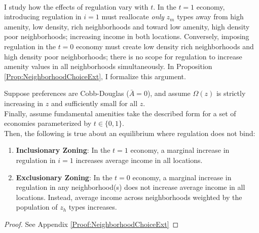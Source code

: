 \documentclass[12pt]{article}
\begin{document}
\paragraph*{} 
I study how the effects of regulation vary with $t$. In the $t = 1$ economy, introducing regulation in $i = 1$ must reallocate \textit{only} $z_{m}$ types away from high amenity, low density, rich neighborhoods and toward low amenity, high density poor neighborhoods; increasing income in both locations. Conversely, imposing regulation in the $t = 0$ economy must create low density rich neighborhoods and high density poor neighborhoods; there is no scope for regulation to increase amenity values in all neighborhoods simultaneously. In Proposition \ref{Prop:NeighborhoodChoiceExt}, I formalize this argument.

\begin{Proposition}\label{Prop:NeighborhoodChoiceExt}
	Suppose preferences are Cobb-Douglas ($\bar{A} = 0$), and assume $\Omega(z)$ is strictly increasing in $z$ and sufficiently small for all $z$. \\
	Finally, assume fundamental amenities take the described form for a set of economies parameterized by $t \in \{0, 1\}$. \\
	Then, the following is true about an equilibrium where regulation does not bind:
	
	\begin{enumerate}
		\item \textbf{Inclusionary Zoning}: In the $t = 1$ economy, a marginal increase in regulation in $i = 1$ increases average income in all locations.
		
		\item \textbf{Exclusionary Zoning}: In the $t = 0$ economy, a marginal increase in regulation in any neighborhood(s) does not increase average income in all locations. Instead, average income across neighborhoods weighted by the population of $z_{h}$ types increases. 
	\end{enumerate}
\end{Proposition}
\begin{proof}
	See Appendix \ref{Proof:NeighborhoodChoiceExt}
\end{proof}
\end{document}
